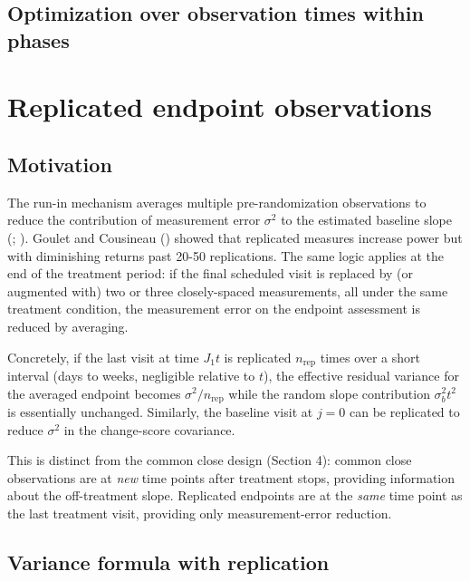 \documentclass[
  11pt,
]{article}
\begin{document}
\subsection{Optimization over observation times within
phases}\label{optimization-over-observation-times-within-phases}

\section{Replicated endpoint
observations}\label{replicated-endpoint-observations}

\subsection{Motivation}\label{motivation}

The run-in mechanism averages multiple pre-randomization observations to
reduce the contribution of measurement error \(\sigma^2\) to the
estimated baseline slope (;
). Goulet and Cousineau
() showed that replicated measures
increase power but with diminishing returns past 20-50 replications. The
same logic applies at the end of the treatment period: if the final
scheduled visit is replaced by (or augmented with) two or three
closely-spaced measurements, all under the same treatment condition, the
measurement error on the endpoint assessment is reduced by averaging.

Concretely, if the last visit at time \(J_1 t\) is replicated
\(n_{\text{rep}}\) times over a short interval (days to weeks,
negligible relative to \(t\)), the effective residual variance for the
averaged endpoint becomes \(\sigma^2 / n_{\text{rep}}\) while the random
slope contribution \(\sigma_b^2 t^2\) is essentially unchanged.
Similarly, the baseline visit at \(j = 0\) can be replicated to reduce
\(\sigma^2\) in the change-score covariance.

This is distinct from the common close design (Section 4): common close
observations are at \emph{new} time points after treatment stops,
providing information about the off-treatment slope. Replicated
endpoints are at the \emph{same} time point as the last treatment visit,
providing only measurement-error reduction.

\subsection{Variance formula with
replication}\label{variance-formula-with-replication}
\end{document}
